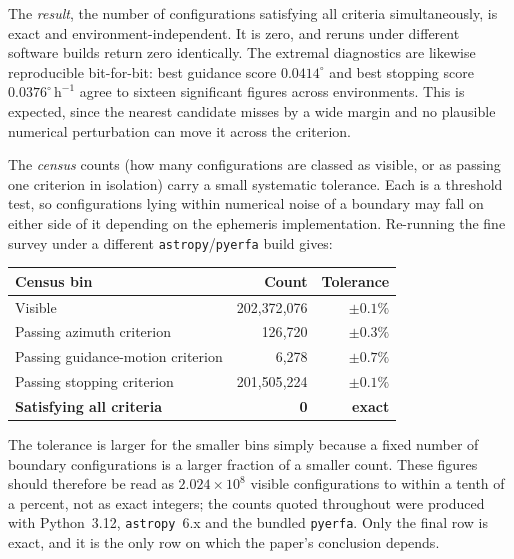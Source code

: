 \documentclass[11pt,a4paper]{article}
\begin{document}
The \emph{result}, the number of configurations satisfying all criteria
simultaneously, is exact and environment-independent.  It is zero, and reruns
under different software builds return zero identically.  The extremal
diagnostics are likewise reproducible bit-for-bit: best guidance score
$0.0414^\circ$ and best stopping score $0.0376^\circ\,\mathrm{h}^{-1}$ agree to
sixteen significant figures across environments.  This is expected, since the
nearest candidate misses by a wide margin and no plausible numerical
perturbation can move it across the criterion.

The \emph{census} counts (how many configurations are classed as visible, or
as passing one criterion in isolation) carry a small systematic tolerance.
Each is a threshold test, so configurations lying within numerical noise of a
boundary may fall on either side of it depending on the ephemeris
implementation.  Re-running the fine survey under a different
\texttt{astropy}/\texttt{pyerfa} build gives:

\begin{center}
\small
\begin{tabular}{@{}lrr@{}}
\toprule
Census bin & Count & Tolerance \\
\midrule
Visible                       & 202{,}372{,}076 & $\pm 0.1\%$ \\
Passing azimuth criterion     &     126{,}720   & $\pm 0.3\%$ \\
Passing guidance-motion criterion &   6{,}278   & $\pm 0.7\%$ \\
Passing stopping criterion    & 201{,}505{,}224 & $\pm 0.1\%$ \\
\midrule
\textbf{Satisfying all criteria} & \textbf{0} & \textbf{exact} \\
\bottomrule
\end{tabular}
\end{center}

The tolerance is larger for the smaller bins simply because a fixed number of
boundary configurations is a larger fraction of a smaller count.  These figures
should therefore be read as $2.024\times10^{8}$ visible configurations to within
a tenth of a percent, not as exact integers; the counts quoted throughout were
produced with Python~3.12, \texttt{astropy}~6.x and the bundled
\texttt{pyerfa}.  Only the final row is exact, and it is the only row on which
the paper's conclusion depends.
\end{document}
